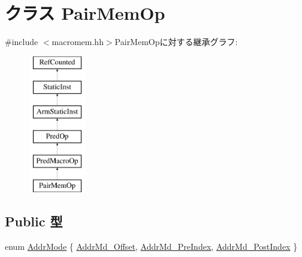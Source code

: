\hypertarget{classArmISA_1_1PairMemOp}{
\section{クラス PairMemOp}
\label{classArmISA_1_1PairMemOp}
}


{\ttfamily \#include $<$macromem.hh$>$}PairMemOpに対する継承グラフ:\begin{figure}[H]
\begin{center}
\leavevmode
\includegraphics[height=6cm]{classArmISA_1_1PairMemOp}
\end{center}
\end{figure}
\subsection*{Public 型}
\begin{DoxyCompactItemize}
\item 
enum \hyperlink{classArmISA_1_1PairMemOp_abf132b4ad93f3557cd3956577592ba68}{AddrMode} \{ \hyperlink{classArmISA_1_1PairMemOp_abf132b4ad93f3557cd3956577592ba68a65551ba1b10e5734f879f0333cdcb7da}{AddrMd\_\-Offset}, 
\hyperlink{classArmISA_1_1PairMemOp_abf132b4ad93f3557cd3956577592ba68ae21d09df49cf2636f746abd6749e9a47}{AddrMd\_\-PreIndex}, 
\hyperlink{classArmISA_1_1PairMemOp_abf132b4ad93f3557cd3956577592ba68af7adc379284699304b17af32b41e8ea1}{AddrMd\_\-PostIndex}
 \}
\end{DoxyCompactItemize}
